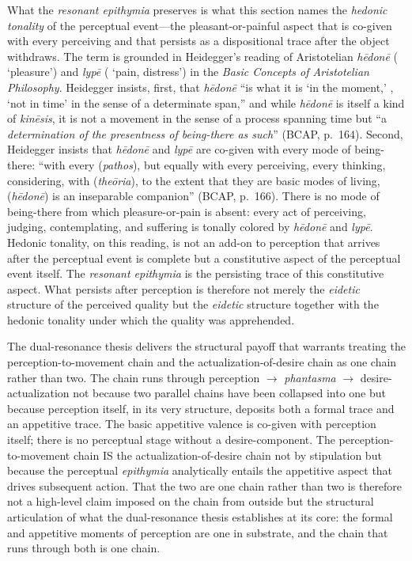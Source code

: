 What the \textit{resonant epithymia} preserves is what this section names the \textit{hedonic tonality} of the perceptual event---the pleasant-or-painful aspect that is co-given with every perceiving and that persists as a dispositional trace after the object withdraws. The term is grounded in Heidegger's reading of Aristotelian \textit{hēdonē} ( `pleasure') and \textit{lypē} ( `pain, distress') in the \textit{Basic Concepts of Aristotelian Philosophy}. Heidegger insists, first, that \textit{hēdonē} ``is what it is `in the moment,' , `not in time' in the sense of a determinate span,'' and while \textit{hēdonē} is itself a kind of \textit{kinēsis}, it is not a movement in the sense of a process spanning time but ``a \textit{determination of the presentness of being-there as such}'' (BCAP, p.~164). Second, Heidegger insists that \textit{hēdonē} and \textit{lypē} are co-given with every mode of being-there: ``with every  (\textit{pathos}), but equally with every perceiving, every thinking, considering, with  (\textit{theōria}), to the extent that they are basic modes of living,  (\textit{hēdonē}) is an inseparable companion'' (BCAP, p.~166). There is no mode of being-there from which pleasure-or-pain is absent: every act of perceiving, judging, contemplating, and suffering is tonally colored by \textit{hēdonē} and \textit{lypē}. Hedonic tonality, on this reading, is not an add-on to perception that arrives after the perceptual event is complete but a constitutive aspect of the perceptual event itself. The \textit{resonant epithymia} is the persisting trace of this constitutive aspect. What persists after perception is therefore not merely the \textit{eidetic} structure of the perceived quality but the \textit{eidetic} structure together with the hedonic tonality under which the quality was apprehended.

The dual-resonance thesis delivers the structural payoff that warrants treating the perception-to-movement chain and the actualization-of-desire chain as one chain rather than two. The chain runs through perception $\rightarrow$ \textit{phantasma} $\rightarrow$ desire-actualization not because two parallel chains have been collapsed into one but because perception itself, in its very structure, deposits both a formal trace and an appetitive trace. The basic appetitive valence is co-given with perception itself; there is no perceptual stage without a desire-component. The perception-to-movement chain IS the actualization-of-desire chain not by stipulation but because the perceptual \textit{epithymia} analytically entails the appetitive aspect that drives subsequent action. That the two are one chain rather than two is therefore not a high-level claim imposed on the chain from outside but the structural articulation of what the dual-resonance thesis establishes at its core: the formal and appetitive moments of perception are one in substrate, and the chain that runs through both is one chain.

